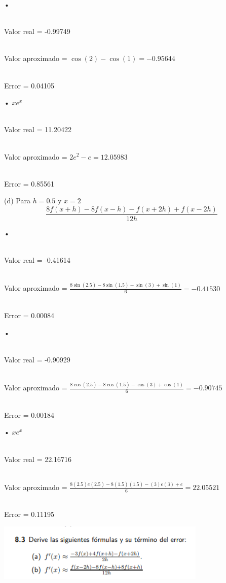 \documentclass[11pt]{article}
\begin{document}
• 

\\Valor real = -0.99749

\\ Valor aproximado = $\cos(2) − \cos(1) = -0.95644$

\\ Error = 0.04105

• $xe^x$

\\Valor real = 11.20422  

\\ Valor aproximado = $2e^2 - e = 12.05983 $

\\ Error = 0.85561


\vspace{0.5cm}
(d) Para $h = 0.5$ y $x=2$
\begin{equation}
 \frac{8f(x + h) - 8f(x - h) - f(x + 2h) + f(x - 2h)}{12h}
\end{equation}

• 

\\Valor real = -0.41614 

\\ Valor aproximado =  $\frac{8\sin(2.5) - 8\sin(1.5) - \sin(3) + \sin(1)}{6}= -0.41530$

\\ Error = 0.00084

• 

\\Valor real = -0.90929

\\ Valor aproximado = $\frac{8\cos(2.5) - 8\cos(1.5) - \cos(3) + \cos(1)}{6} = -0.90745$

\\ Error = 0.00184

• $xe^x$

\\Valor real = 22.16716 

\\ Valor aproximado = $\frac{8(2.5)e(2.5) - 8(1.5)(1.5) - (3)e(3) + e}{6} =22.05521$

\\ Error = 0.11195


\vspace{1cm}
\begin{center}
    \includegraphics[keepaspectratio, width=10cm]{S2.png}
    \caption{\\}
\end{center} 
\end{document}

